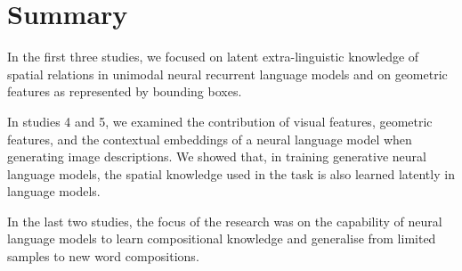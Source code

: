 \section{Summary}
\label{sec:summaries:conclusion}

In the first three studies, we focused on latent extra-linguistic knowledge of spatial relations in unimodal neural recurrent language models and on geometric features as represented by bounding boxes. 

In studies 4 and 5, we examined the contribution of visual features, geometric features, and the contextual embeddings of a neural language model when generating image descriptions. 
We showed that, in training generative neural language models, the spatial knowledge used in the task is also learned latently in language models. 

In the last two studies, the focus of the research was on the capability of neural language models to learn compositional knowledge and generalise from limited samples to new word compositions.
